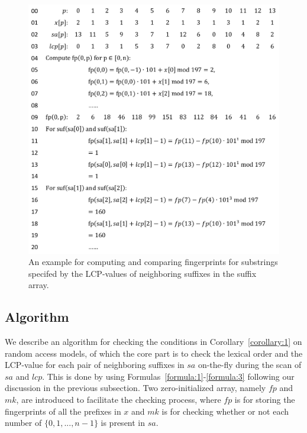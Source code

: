 \documentclass[10pt,journal,compsoc]{IEEEtran}
\begin{document}
\begin{figure}
	\centering
	
	\includegraphics[width = 0.9\columnwidth]{example}
	\caption{An example for computing and comparing fingerprints for substrings specifed by the LCP-values of neighboring suffixes in the suffix array. \label{fig:example}}	
\end{figure}

\subsection{Algorithm} \label{sec:method1:algorithm}

We describe an algorithm for checking the conditions in Corollary~\ref{corollary:1} on random access models, of which the core part is to check the lexical order and the LCP-value for each pair of neighboring suffixes in $sa$ on-the-fly during the scan of $sa$ and $lcp$. This is done by using Formulas~\ref{formula:1}-\ref{formula:3} following our discussion in the previous subsection. Two zero-initialized array, namely $fp$ and $mk$, are introduced to facilitate the checking process, where $fp$ is for storing the fingerprints of all the prefixes in $x$ and $mk$ is for checking whether or not each number of $\{0, 1, ..., n - 1\}$ is present in $sa$.
\end{document}
